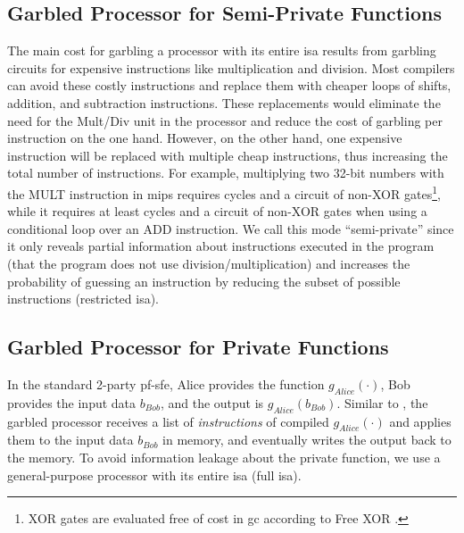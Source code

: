 \subsection{Garbled Processor for Semi-Private Functions}\label{ssec:processor-mips-sfe-semiprivate}
The main cost for garbling a processor with its entire \acrshort{isa} results from garbling circuits for expensive instructions like multiplication and division.
Most compilers can avoid these costly instructions and replace them with cheaper loops of shifts, addition, and subtraction instructions.
These replacements would eliminate the need for the Mult/Div unit in the processor and reduce the cost of garbling per instruction on the one hand.
However, on the other hand, one expensive instruction will be replaced with multiple cheap instructions, thus increasing the total number of instructions.
For example, multiplying two 32-bit numbers with the MULT instruction in \gls{mips} requires  cycles and a circuit of  non-XOR gates\footnote{XOR gates are evaluated free of cost in \acrshort{gc} according to Free XOR \cite{kolesnikov2008improved}.}, while it requires at least  cycles and a circuit of  non-XOR gates when using a conditional loop over an ADD instruction.
We call this mode ``semi-private'' since it only reveals partial information about instructions executed in the program (that the program does not use division/multiplication) and increases the probability of guessing an instruction by reducing the subset of possible instructions (restricted \acrshort{isa}).

\subsection{Garbled Processor for Private Functions} \label{ssec:processor-mips-sfe-private}
In the standard 2-party \acrshort{pf-sfe}, Alice provides the function $g_{Alice}(\cdot)$, Bob provides the input data $b_{Bob}$, and the output is $g_{Alice}(b_{Bob})$.
Similar to , the garbled processor receives a list of \emph{instructions} of compiled $g_{Alice}(\cdot)$ and applies them to the input data $b_{Bob}$ in memory, and eventually writes the output back to the memory.
To avoid information leakage about the private function, we use a general-purpose processor with its entire \acrshort{isa} (full \acrshort{isa}).

